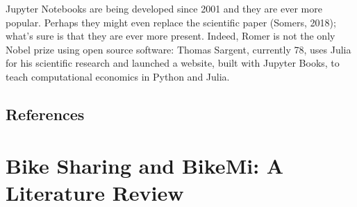 \documentclass[letterpaper,10pt,english]{jupyterBook}
\begin{document}
\sphinxAtStartPar
Jupyter Notebooks are being developed since 2001 and they are ever more popular. Perhaps they might even replace the scientific paper (Somers, 2018); what’s sure is that they are ever more present. Indeed, Romer is not the only Nobel prize using open source software: Thomas Sargent, currently 78, uses Julia for his scientific research and launched a website,  built with Jupyter Books, to teach computational economics in Python and Julia.


\section{References}
\label{\detokenize{01-introduction:references}}













































































\chapter{Bike Sharing and BikeMi: A Literature Review}
\label{\detokenize{02-bikesharing_and_bikemi:bike-sharing-and-bikemi-a-literature-review}}\label{\detokenize{02-bikesharing_and_bikemi::doc}}
\end{document}

